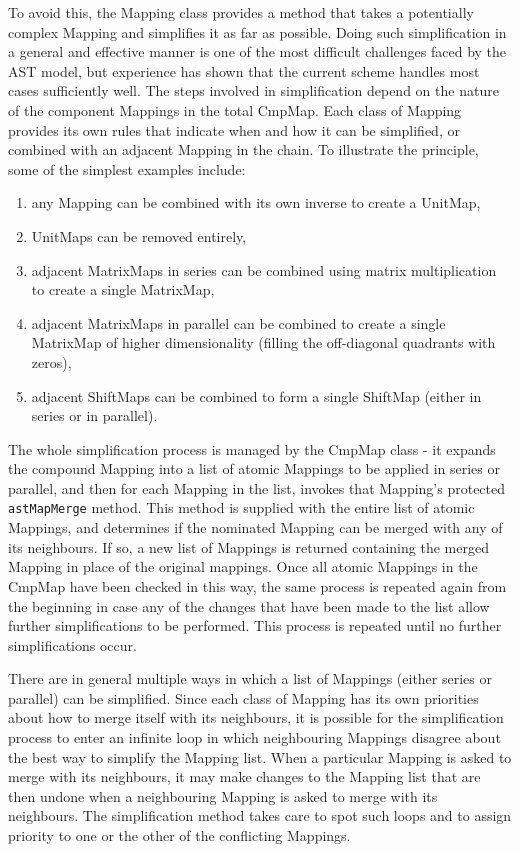 \documentclass[final,authoryear,5p,times,twocolumn]{elsarticle}
\begin{document}
To avoid this, the Mapping class provides a method that takes a
potentially complex Mapping and simplifies it as far as possible. Doing
such simplification in a general and effective manner is one of the most
difficult challenges faced by the AST model, but experience has shown
that the current scheme handles most cases
sufficiently well. The steps involved in simplification depend on the
nature of the component Mappings in the total CmpMap. Each class of
Mapping provides its own rules that indicate when and how it can be
simplified, or combined with an adjacent Mapping in the chain. To
illustrate the principle, some of the simplest examples include:

\begin{enumerate}
\item any Mapping can be combined with its own inverse to create a UnitMap,
\item UnitMaps can be removed entirely,
\item adjacent MatrixMaps in series can be combined using matrix
multiplication to create a single MatrixMap,
\item adjacent MatrixMaps in parallel can be combined to create a
single MatrixMap of higher dimensionality (filling the off-diagonal
quadrants with zeros),
\item adjacent ShiftMaps can be combined to form a single ShiftMap
(either in series or in parallel).
\end{enumerate}

The whole simplification process is managed by the CmpMap class - it
expands the compound Mapping into a list of atomic Mappings to be applied
in series or parallel, and then for each Mapping in the list, invokes
that Mapping's protected \texttt{astMapMerge} method. This method is
supplied with the entire list of atomic Mappings, and determines if the
nominated Mapping can be merged with any of its neighbours. If so, a new
list of Mappings is returned containing the merged Mapping in place of
the original mappings. Once all atomic Mappings in the CmpMap have been
checked in this way, the same process is repeated again from the
beginning in case any of the changes that have been made to the list
allow further simplifications to be performed. This process is repeated
until no further simplifications occur.

There are in general multiple ways in which a list of Mappings (either
series or parallel) can be simplified. Since each class of Mapping has
its own priorities about how to merge itself with its neighbours, it is
possible for the simplification process to enter an infinite loop in
which neighbouring Mappings disagree about the best way to simplify the
Mapping list. When a particular Mapping is asked to merge with its
neighbours, it may make changes to the Mapping list that are then undone
when a neighbouring Mapping is asked to merge with its neighbours. The
simplification method takes care to spot such loops and to assign priority
to one or the other of the conflicting Mappings.
\end{document}
